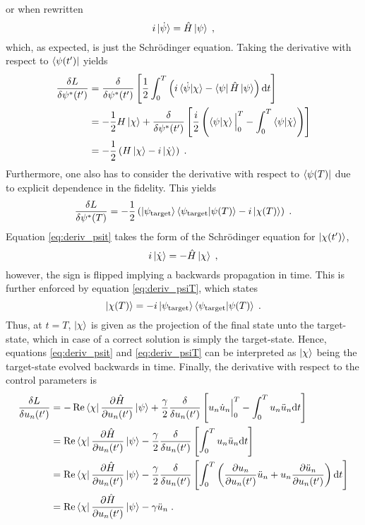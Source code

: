 or when rewritten
\begin{equation}
	 i \ket{\dot{\psi}} =  \hat{H} \ket{\psi} \; ,
\end{equation}
which, as expected, is just the Schrödinger equation.
Taking the derivative with respect to $\bra{\psi (t')}$ yields
\begin{align}
	\frac{\delta L}{\delta \psi ^* (t')} &= \frac{\delta }{\delta \psi ^* (t')} \left[ \frac{1}{2} \int_{0}^{T} \left( i \braket{\dot{\psi} | \chi} -  \bra{\psi} \hat{H} \ket{\psi} \right) \mathrm{d}t \right] \nonumber \\ 
	&= - \frac{1}{2} H \ket{\chi} + \frac{\delta }{\delta \psi ^* (t')} \left[ \frac{i}{2} \left( \braket{\psi | \chi} \Big|_0^T - \int_0^T \braket{\psi | \dot{\chi}} \right) \right] \nonumber \\
	&= - \frac{1}{2} \left( H \ket{\chi} -i \ket{\dot{\chi}}  \right) \; . \label{eq:deriv_psit}
\end{align}
Furthermore, one also has to consider the derivative with respect to $\bra{\psi (T)}$ due to explicit dependence in the fidelity. This yields
\begin{equation}
	\frac{\delta L}{\delta \psi ^* (T)} = - \frac{1}{2} \left( \ket{\psi_{\mathrm{target}}} \braket{\psi_{\mathrm{target}} | \psi (T)} - i \ket{\chi (T)} \right) \; . \label{eq:deriv_psiT}
\end{equation}
Equation \ref{eq:deriv_psit} takes the form of the Schrödinger equation for $\ket{\chi (t')}$,
\begin{equation}
	 i \ket{\dot{\chi}} =  - \hat{H} \ket{\chi} \; ,
\end{equation}
however, the sign is flipped implying a backwards propagation in time. This is further enforced by equation \ref{eq:deriv_psiT}, which states
\begin{equation}
	 \ket{\chi (T)} = -i \ket{\psi_{\mathrm{target}}} \braket{\psi_{\mathrm{target}} | \psi (T)} \; .
\end{equation}
Thus, at $t = T$, $\ket{\chi}$ is given as the projection of the final state unto the target-state, which in case of a correct solution is simply the target-state. Hence, equations \ref{eq:deriv_psit} and \ref{eq:deriv_psiT} can be interpreted as $\ket{\chi}$ being the target-state evolved backwards in time.
Finally, the derivative with respect to the control parameters is 
\begin{align}
	\frac{\delta L}{\delta u_n (t')} &= - \Re \bra{\chi} \pdv{\hat{H}}{u_n (t')} \ket{\psi} + \frac{\gamma}{2} \frac{\delta }{\delta u_n (t')} \left[ u_n \dot{u}_n \Big|_0^T - \int_0^T u_n \ddot{u}_n \mathrm{d}t \right] \nonumber \\
	&=  \Re \bra{\chi} \pdv{\hat{H}}{u_n (t')} \ket{\psi} - \frac{\gamma}{2} \frac{\delta }{\delta u_n (t')} \left[ \int_0^T u_n \ddot{u}_n \mathrm{d}t \right] \nonumber \\
	&=  \Re \bra{\chi} \pdv{\hat{H}}{u_n (t')} \ket{\psi} - \frac{\gamma}{2} \frac{\delta }{\delta u_n (t')} \left[ \int_0^T \left( \pdv{u_n}{u_n (t')} \ddot{u}_n + u_n \pdv{\ddot{u}_n}{u_n (t')} \right) \mathrm{d}t \right] \nonumber \\
	&= \Re \bra{\chi} \pdv{\hat{H}}{u_n (t')} \ket{\psi} - \gamma \ddot{u}_n \; . \label{eq:deriv_u} 
\end{align} 
